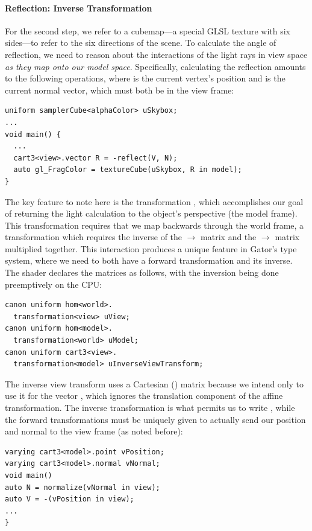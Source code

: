 {\paragraph{Reflection: Inverse Transformation}
For the second step, we refer to a cubemap---a special GLSL texture with six sides---to refer to the six directions of the scene.  
To calculate the angle of reflection, we need to reason about the interactions of the light rays in view space \emph{as they map onto our model space}.  
Specifically, calculating the reflection amounts to the following operations, where  is the current vertex's position and  is the current normal vector, which must both be in the view frame:
%
\begin{lstlisting}
uniform samplerCube<alphaColor> uSkybox;
...
void main() {
  ...
  cart3<view>.vector R = -reflect(V, N);
  auto gl_FragColor = textureCube(uSkybox, R in model);
}
\end{lstlisting}
%
The key feature to note here is the transformation , which accomplishes our goal of returning the light calculation to the object's perspective (the model frame).
This transformation requires that we map backwards through the world frame, a transformation which requires the inverse of the $\rightarrow$ matrix and the $\rightarrow$ matrix multiplied together.
This interaction produces a unique feature in Gator's type system, where we need to both have a forward transformation and its inverse.
The shader declares the matrices as follows, with the inversion being done preemptively on the CPU:
%
\begin{lstlisting}
canon uniform hom<world>.
  transformation<view> uView;
canon uniform hom<model>.
  transformation<world> uModel;
canon uniform cart3<view>.
  transformation<model> uInverseViewTransform;
\end{lstlisting}
%
The inverse view transform uses a Cartesian () matrix because
we intend only to use it for the vector , which ignores the translation component of the affine transformation.  The inverse transformation is what permits us to write , while the forward transformations must be uniquely given to actually send our position and normal to the view frame (as noted before):
%
\begin{lstlisting}
varying cart3<model>.point vPosition;
varying cart3<model>.normal vNormal;
void main()
auto N = normalize(vNormal in view);
auto V = -(vPosition in view);
...
}
\end{lstlisting}
%
}
